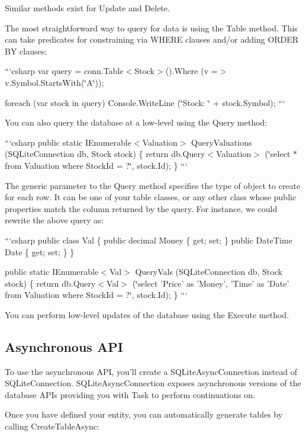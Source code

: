 Similar methods exist for {\ttfamily Update} and {\ttfamily Delete}.

The most straightforward way to query for data is using the {\ttfamily Table} method. This can take predicates for constraining via W\+H\+E\+R\+E clauses and/or adding O\+R\+D\+E\+R B\+Y clauses\+:

```csharp var query = conn.\+Table$<$\+Stock$>$().Where (v =$>$ v.\+Symbol.\+Starts\+With(\char`\"{}\+A\char`\"{}));

foreach (var stock in query) Console.\+Write\+Line (\char`\"{}\+Stock\+: \char`\"{} + stock.\+Symbol); ```

You can also query the database at a low-\/level using the {\ttfamily Query} method\+:

```csharp public static I\+Enumerable$<$\+Valuation$>$ Query\+Valuations (S\+Q\+Lite\+Connection db, Stock stock) \{ return db.\+Query$<$\+Valuation$>$ (\char`\"{}select $\ast$ from Valuation where Stock\+Id = ?\char`\"{}, stock.\+Id); \} ```

The generic parameter to the {\ttfamily Query} method specifies the type of object to create for each row. It can be one of your table classes, or any other class whose public properties match the column returned by the query. For instance, we could rewrite the above query as\+:

```csharp public class Val \{ public decimal Money \{ get; set; \} public Date\+Time Date \{ get; set; \} \}

public static I\+Enumerable$<$\+Val$>$ Query\+Vals (S\+Q\+Lite\+Connection db, Stock stock) \{ return db.\+Query$<$\+Val$>$ (\char`\"{}select '\+Price' as '\+Money', '\+Time' as '\+Date' from Valuation where Stock\+Id = ?\char`\"{}, stock.\+Id); \} ```

You can perform low-\/level updates of the database using the {\ttfamily Execute} method.

\subsection*{Asynchronous A\+P\+I}

To use the asynchronous A\+P\+I, you'll create a {\ttfamily S\+Q\+Lite\+Async\+Connection} instead of {\ttfamily S\+Q\+Lite\+Connection}. {\ttfamily S\+Q\+Lite\+Async\+Connection} exposes asynchronous versions of the database A\+P\+Is providing you with {\ttfamily Task} to perform continuations on.

Once you have defined your entity, you can automatically generate tables by calling {\ttfamily Create\+Table\+Async}\+:

